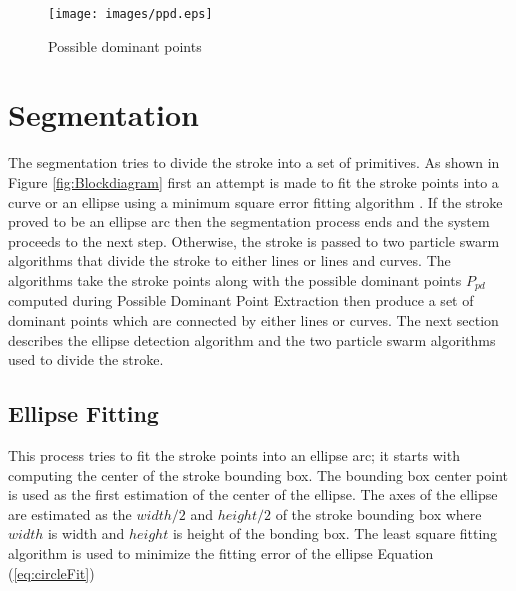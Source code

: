 \begin{figure}
	\centering
		\texttt{[image: images/ppd.eps]}
	\caption{Possible dominant points}%
	\label{fig:LabelsPPD}
\end{figure}

\section{Segmentation}
\label{sec:Segmentation}
The segmentation tries to divide the stroke into a set of primitives. As shown in Figure \ref{fig:Blockdiagram} first an attempt is made to fit the stroke points into a curve or an ellipse using a minimum square error fitting algorithm \cite{chernov}. If the stroke proved to be an ellipse arc then the segmentation process ends and the system proceeds to the next step. Otherwise, the stroke is passed to two particle swarm algorithms that divide the stroke to either lines or lines and curves. The algorithms take the stroke points along with the possible dominant points $P_{pd}$ computed during Possible Dominant Point Extraction then produce a set of dominant points which are connected by either lines or curves. The next section describes the ellipse detection algorithm and the two particle swarm algorithms used to divide the stroke.


\subsection{Ellipse Fitting }
\label{sec:EllipseDetection}

This process tries to fit the stroke points into an ellipse arc; it starts with computing the center of the stroke bounding box. The bounding box center point is used as the first estimation of the center of the ellipse. The axes of the ellipse are estimated as the $width/2$ and $height/2$ of the stroke bounding box where $width$ is width and $height$ is height of the bonding box. The least square fitting algorithm \cite{chernov} is used to minimize the fitting error of the ellipse Equation (\ref{eq:circleFit})  

